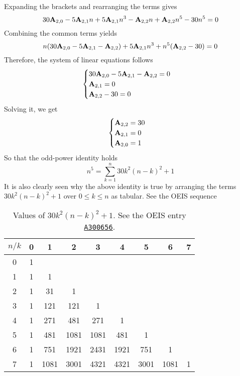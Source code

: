 Expanding the brackets and rearranging the terms gives
\begin{equation*}
    30 {\mathbf{A}} \sb{2,0} - 5 {\mathbf{A}} \sb{2,1} n + 5 {\mathbf{A}} \sb{2,1} n^3 - {\mathbf{A}} \sb{2,2} n + {\mathbf{A}} \sb{2,2} n^5 - 30n^5 = 0
\end{equation*}
Combining the common terms yields
\begin{equation*}
    n (30 {\mathbf{A}} \sb{2,0} - 5 {\mathbf{A}} \sb{2,1} - {\mathbf{A}} \sb{2,2}) + 5 {\mathbf{A}} \sb{2,1} n^3 + n^5 ({\mathbf{A}} \sb{2,2} - 30) = 0
\end{equation*}
Therefore, the system of linear equations follows
\begin{equation*}
    \begin{cases}
        30 {\mathbf{A}} \sb{2,0} - 5 {\mathbf{A}} \sb{2,1} - {\mathbf{A}} \sb{2,2} = 0 \\
        {\mathbf{A}} \sb{2,1} = 0 \\
        {\mathbf{A}} \sb{2,2} - 30 = 0
    \end{cases}
\end{equation*}
Solving it, we get
\begin{equation*}
    \begin{cases}
        {\mathbf{A}} \sb{2,2} = 30 \\
        {\mathbf{A}} \sb{2,1} = 0 \\
        {\mathbf{A}} \sb{2,0} = 1
    \end{cases}
\end{equation*}
So that the odd-power identity holds
\begin{equation*}
    n^5 = \sum_{k=1}^{n} 30k^2(n-k)^2 + 1
\end{equation*}
It is also clearly seen
why the above identity is true by arranging the terms $30k^2(n-k)^2 + 1$ over $0 \leq k \leq n$ as tabular.
See the OEIS sequence~\cite{kolosov2018fifth}
\begin{table}[H]
    \setlength\extrarowheight{-6pt}
    \begin{tabular}{c|cccccccc}
        $n/k$ & 0 & 1    & 2    & 3    & 4    & 5    & 6    & 7 \\
        \hline
        0     & 1 &      &      &      &      &      &      &   \\
        1     & 1 & 1    &      &      &      &      &      &   \\
        2     & 1 & 31   & 1    &      &      &      &      &   \\
        3     & 1 & 121  & 121  & 1    &      &      &      &   \\
        4     & 1 & 271  & 481  & 271  & 1    &      &      &   \\
        5     & 1 & 481  & 1081 & 1081 & 481  & 1    &      &   \\
        6     & 1 & 751  & 1921 & 2431 & 1921 & 751  & 1    &   \\
        7     & 1 & 1081 & 3001 & 4321 & 4321 & 3001 & 1081 & 1
    \end{tabular}
    \caption{Values of $30k^2(n-k)^2 + 1$.
    See the OEIS entry \href{https://oeis.org/A300656}{\texttt{A300656}}.}
    \label{tab:row-sums-gives-fifth-power}
\end{table}

